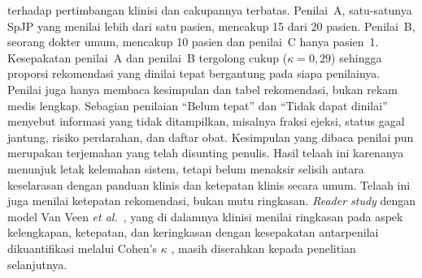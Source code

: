 \begin{enumerate}
    terhadap pertimbangan klinisi dan cakupannya terbatas. Penilai~A, satu-satunya SpJP yang
    menilai lebih dari satu pasien, mencakup 15 dari 20 pasien. Penilai~B, seorang dokter umum,
    mencakup 10 pasien dan penilai~C hanya pasien~1. Kesepakatan penilai~A dan penilai~B
    tergolong cukup ($\kappa = 0{,}29$) sehingga proporsi rekomendasi yang dinilai tepat
    bergantung pada siapa penilainya. Penilai juga hanya membaca kesimpulan dan tabel
    rekomendasi, bukan rekam medis lengkap. Sebagian penilaian ``Belum tepat'' dan ``Tidak
    dapat dinilai'' menyebut informasi yang tidak ditampilkan, misalnya fraksi ejeksi, status
    gagal jantung, risiko perdarahan, dan daftar obat. Kesimpulan yang dibaca penilai pun
    merupakan terjemahan yang telah disunting penulis. Hasil telaah ini karenanya menunjuk letak
    kelemahan sistem, tetapi belum menaksir selisih antara keselarasan dengan panduan klinis
    dan ketepatan klinis secara umum. Telaah ini juga menilai ketepatan rekomendasi, bukan mutu
    ringkasan. \emph{Reader study} dengan model Van Veen \textit{et al.}~\cite{vanveen2023},
    yang di dalamnya klinisi menilai ringkasan pada aspek kelengkapan, ketepatan, dan
    keringkasan dengan kesepakatan antarpenilai dikuantifikasi melalui Cohen's $\kappa$
    \cite{cohen1960}, masih diserahkan kepada penelitian selanjutnya.
\end{enumerate}
